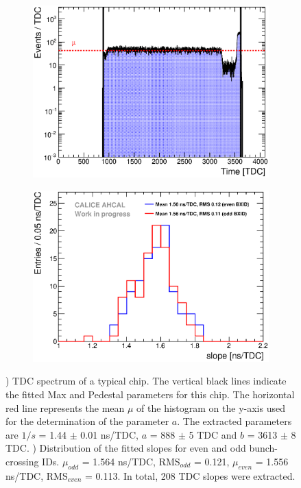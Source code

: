 \documentclass{JINST}
\begin{document}
\begin{figure}[htbp!]
  \begin{subfigure}[t]{0.49\textwidth}
    \centering
    \includegraphics[width=1\linewidth]{fig/ExampleTDCSpectra.eps}
    \caption{} \label{fig:TDC_Spectrum}
  \end{subfigure}
  \hfill
  \begin{subfigure}[t]{0.49\textwidth}
    \centering
    \includegraphics[width=1\linewidth]{fig/SlopesTDC.eps}
    \caption{} \label{fig:slopes}
  \end{subfigure}
  \caption{) TDC spectrum of a typical chip. The vertical black lines indicate the fitted Max and Pedestal parameters for this chip. The horizontal red line represents the mean $\mu$ of the histogram on the y-axis used for the determination of the parameter $a$. The extracted parameters are $1/s$ = 1.44 $\pm$ 0.01 ns/TDC, $a$ = 888 $\pm$ 5 TDC and $b$ = 3613 $\pm$ 8 TDC. ) Distribution of the fitted slopes for even and odd bunch-crossing IDs. $\mu_{odd}$ = 1.564 ns/TDC, RMS$_{odd}$ = 0.121, $\mu_{even}$ = 1.556 ns/TDC, RMS$_{even}$ = 0.113. In total, 208 TDC slopes were extracted.}
\end{figure}
\end{document}
